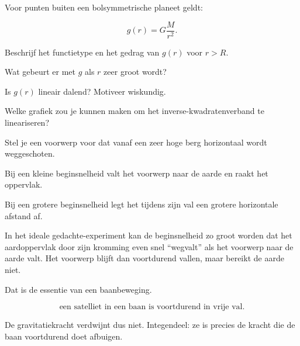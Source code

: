 \documentclass{ximera}
\begin{document}
\begin{oefening}{\oefU\ESS}

Voor punten buiten een bolsymmetrische planeet geldt:

\[
g(r)=G\frac{M}{r^2}.
\]

\begin{question}
Beschrijf het functietype en het gedrag van $g(r)$ voor $r>R$.
\end{question}

\begin{question}
Wat gebeurt er met $g$ als $r$ zeer groot wordt?
\end{question}

\begin{question}
Is $g(r)$ lineair dalend? Motiveer wiskundig.
\end{question}

\begin{question}
Welke grafiek zou je kunnen maken om het inverse-kwadratenverband te
lineariseren?
\end{question}

\end{oefening}




Stel je een voorwerp voor dat vanaf een zeer hoge berg horizontaal wordt
weggeschoten.

Bij een kleine beginsnelheid valt het voorwerp naar de aarde en raakt
het oppervlak.

Bij een grotere beginsnelheid legt het tijdens zijn val een grotere
horizontale afstand af.

In het ideale gedachte-experiment kan de beginsnelheid zo groot worden
dat het aardoppervlak door zijn kromming even snel ``wegvalt'' als het
voorwerp naar de aarde valt. Het voorwerp blijft dan voortdurend vallen,
maar bereikt de aarde niet.

Dat is de essentie van een baanbeweging.

\begin{center}
\[
\boxed{
\text{een satelliet in een baan is voortdurend in vrije val}.
}
\]
\end{center}

De gravitatiekracht verdwijnt dus niet. Integendeel: ze is precies de
kracht die de baan voortdurend doet afbuigen.
\end{document}
